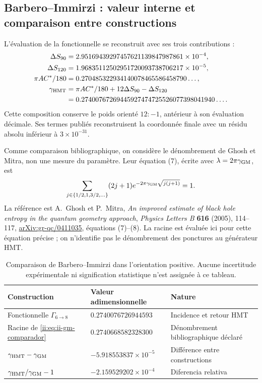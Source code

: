 \subsection{Barbero--Immirzi : valeur interne et comparaison entre constructions}

L’évaluation de la fonctionnelle se reconstruit avec ses trois contributions :
\begin{align*}
 \Delta S_{90}&=2.95169439297457621139847987861\times10^{-4},\\
 \Delta S_{120}&=1.96835112502951720093738706217\times10^{-5},\\
 \pi AC^*/180&=0.270485322934140078465586458790\ldots,\\
 \gamma_{\rm HMT}&=\pi AC^*/180+12\Delta S_{90}-\Delta S_{120}\\
 &=0.27400767269445927474725526077398041940\ldots.
\end{align*}
Cette composition conserve le poids orienté \(12:-1\), antérieur à son
évaluation décimale. Ses termes publiés reconstruisent la coordonnée
finale avec un résidu absolu inférieur à \(3\times10^{-31}\).

Comme comparaison bibliographique, on considère le dénombrement de Ghosh et Mitra,
non une mesure du paramètre. Leur équation (7), écrite avec
\(\lambda=2\pi\gamma_{\rm GM}\), est
\begin{equation}
 \sum_{j\in\{1/2,1,3/2,\ldots\}}(2j+1)
 e^{-2\pi\gamma_{\rm GM}\sqrt{j(j+1)}}=1.
 \label{ii:eq:ii-gm-comparador}
\end{equation}
La référence est A.~Ghosh et P.~Mitra,
\emph{An improved estimate of black hole entropy in the quantum geometry
approach}, \emph{Physics Letters B} \textbf{616} (2005), 114--117,
\href{https://arxiv.org/abs/gr-qc/0411035}{arXiv:gr-qc/0411035},
équations (7)--(8). La racine est évaluée ici pour cette équation précise ;
on n’identifie pas le dénombrement des ponctures au générateur HMT.

\begin{table}[htbp]
\centering\small
\begin{tabular}{@{}lll@{}}
\toprule
Construction & Valeur adimensionnelle & Nature\\
\midrule
Fonctionnelle \(\Gamma_{6\to8}\) & \(0.2740076726944593\) & Incidence et retour HMT\\
Racine de \eqref{ii:eq:ii-gm-comparador} & \(0.2740668582328300\) & Dénombrement bibliographique déclaré\\
\midrule
\(\gamma_{\rm HMT}-\gamma_{\rm GM}\) & \(-5.918553837\times10^{-5}\) & Différence entre constructions\\
\(\gamma_{\rm HMT}/\gamma_{\rm GM}-1\) & \(-2.159529202\times10^{-4}\) & Diferencia relativa\\
\bottomrule
\end{tabular}
\caption{Comparaison de Barbero--Immirzi dans l’orientation positive. Aucune
incertitude expérimentale ni signification statistique n’est assignée à ce tableau.}
\label{ii:tab:ii-barbero-comparacion}
\end{table}

